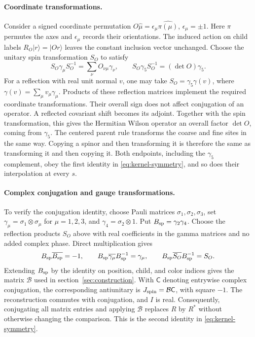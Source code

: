 \documentclass[11pt,a4paper]{article}
\theoremstyle{remark}
\begin{document}
\paragraph{Coordinate transformations.}
Consider a signed coordinate permutation
$O\hat\mu=\epsilon_\mu\widehat{\pi(\mu)}$,
$\epsilon_\mu=\pm1$. Here $\pi$ permutes the axes and $\epsilon_\mu$ records their
orientations. The induced action on child labels
$R_O|r\rangle=|Or\rangle$ leaves the constant inclusion vector
unchanged. Choose the unitary spin transformation $S_O$ to satisfy
\begin{equation}
 S_O\gamma_\mu S_O^{-1}=\sum_\nu O_{\nu\mu}\gamma_\nu,
 \qquad S_O\gamma_5S_O^{-1}=(\det O)\gamma_5.
\end{equation}
For a reflection with real unit normal $v$, one may take
$S_O=\gamma_5\gamma(v)$, where
$\gamma(v)=\sum_\mu v_\mu\gamma_\mu$. Products of these reflection matrices implement the required coordinate
transformations. Their overall sign does not affect conjugation of an
operator. A reflected covariant shift becomes its adjoint. Together
with the spin transformation, this gives the Hermitian Wilson operator
an overall factor $\det O$, coming from $\gamma_5$. The centered
parent rule transforms the coarse and fine sites in the same way.
Copying a spinor and then transforming it is therefore the same as
transforming it and then copying it. Both endpoints, including the
$\gamma_5$ complement, obey the first identity in
\eqref{eq:kernel-symmetry}, and so does their interpolation at every $s$.

\paragraph{Complex conjugation and gauge transformations.}
To verify the conjugation identity, choose Pauli matrices
$\sigma_1,\sigma_2,\sigma_3$, set
$\gamma_\mu=\sigma_1\otimes\sigma_\mu$ for $\mu=1,2,3$,
and $\gamma_4=\sigma_2\otimes1$. Put
$B_{\rm sp}=\gamma_2\gamma_4$. Choose the reflection products
$S_O$ above with real coefficients in the gamma matrices and no
added complex phase. Direct multiplication gives
\begin{equation}
 B_{\rm sp}\overline{B_{\rm sp}}=-1,\qquad
 B_{\rm sp}\overline{\gamma_\mu}B_{\rm sp}^{-1}=\gamma_\mu,
 \qquad B_{\rm sp}\overline{S_O}B_{\rm sp}^{-1}=S_O.
\end{equation}
Extending $B_{\rm sp}$ by the identity on position, child, and color
indices gives the matrix $\mathcal B$ used in
section~\ref{sec:construction}. With $\mathsf C$ denoting entrywise
complex conjugation, the corresponding antiunitary is
$J_{\rm spin}=\mathcal B\mathsf C$, with square $-1$.
The reconstruction commutes with conjugation, and $I$ is real.
Consequently, conjugating all matrix entries and applying $\mathcal B$
replaces $R$ by $R^*$ without otherwise changing the comparison.
This is the second identity in \eqref{eq:kernel-symmetry}.
\end{document}
